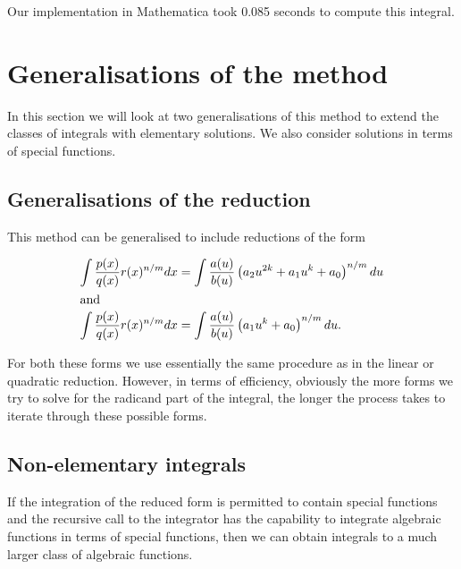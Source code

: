 \documentclass[12pt]{article}
\numberwithin{equation}{section}
\def\todo#1{\textcolor{red}{\textbf{**** TODO -- #1 ****}}}
\theoremstyle{definition}
\newtheorem{example}{Example}[section]
\begin{document}
Our implementation in Mathematica took 0.085 seconds to compute this integral.  

\iffalse
\begin{example}
In our final example we consider the particularly elegant integral 
$$\int\frac{\left(x^2-1\right)\sqrt{x^4+x^2+1}}{\left(x^2+1\right)\left(x^4+x^3+x^2+x+1\right)} \, dx.$$

\todo{Finish this example.}

\end{example}
\fi

\section{Generalisations of the method}

In this section we will look at two generalisations of this method to extend the 
classes of integrals with elementary solutions. We also consider solutions in terms 
of special functions. 

\subsection{Generalisations of the reduction}

This method can be generalised to include reductions of the form 

\begin{align*}
\int \frac{p(x)}{q(x)}r(x)^{n/m}dx &= \int \frac{a(u)}{b(u)}\left(a_2u^{2k}+a_1u^k+a_0\right)^{n/m}du \\
\intertext{and}
\int \frac{p(x)}{q(x)}r(x)^{n/m}dx &= \int \frac{a(u)}{b(u)}\left(a_1u^k+a_0\right)^{n/m}du.\\
\end{align*}

For both these forms we use essentially the same procedure as in the linear or quadratic 
reduction. However, in terms of efficiency, obviously the more forms we try to solve for 
the radicand part of the integral, the longer the process takes to iterate through these 
possible forms. 

\subsection{Non-elementary integrals}

If the integration of the reduced form is permitted to contain special functions and the 
recursive call to the integrator has the capability to integrate algebraic functions 
in terms of special functions, then we can obtain integrals to a much larger class of 
algebraic functions. 
\end{document}
